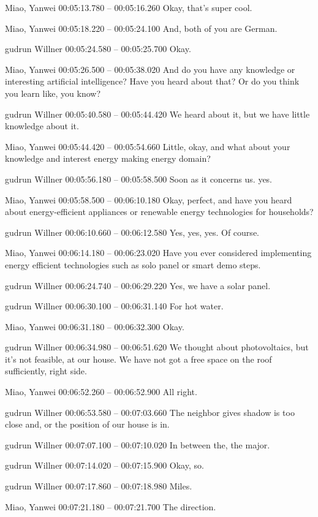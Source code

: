 {Miao, Yanwei 00:05:13.780 -- 00:05:16.260
Okay, that's super cool.

Miao, Yanwei 00:05:18.220 -- 00:05:24.100
And, both of you are German.

gudrun Willner 00:05:24.580 -- 00:05:25.700
Okay.

Miao, Yanwei 00:05:26.500 -- 00:05:38.020
And do you have any knowledge or interesting artificial intelligence? Have you heard about that? Or do you think you learn like, you know?

gudrun Willner 00:05:40.580 -- 00:05:44.420
We heard about it, but we have little knowledge about it.

Miao, Yanwei 00:05:44.420 -- 00:05:54.660
Little, okay, and what about your knowledge and interest energy making energy domain?

gudrun Willner 00:05:56.180 -- 00:05:58.500
Soon as it concerns us. yes.

Miao, Yanwei 00:05:58.500 -- 00:06:10.180
Okay, perfect, and have you heard about energy-efficient appliances or renewable energy technologies for households?

gudrun Willner 00:06:10.660 -- 00:06:12.580
Yes, yes, yes. Of course.

Miao, Yanwei 00:06:14.180 -- 00:06:23.020
Have you ever considered implementing energy efficient technologies such as solo panel or smart demo steps.

gudrun Willner 00:06:24.740 -- 00:06:29.220
Yes, we have a solar panel.

gudrun Willner 00:06:30.100 -- 00:06:31.140
For hot water.

Miao, Yanwei 00:06:31.180 -- 00:06:32.300
Okay.

gudrun Willner 00:06:34.980 -- 00:06:51.620
We thought about photovoltaics, but it's not feasible, at our house. We have not got a free space on the roof sufficiently, right side.

Miao, Yanwei 00:06:52.260 -- 00:06:52.900
All right.

gudrun Willner 00:06:53.580 -- 00:07:03.660
The neighbor gives shadow is too close and, or the position of our house is in.

gudrun Willner 00:07:07.100 -- 00:07:10.020
In between the, the major.

gudrun Willner 00:07:14.020 -- 00:07:15.900
Okay, so.

gudrun Willner 00:07:17.860 -- 00:07:18.980
Miles.

Miao, Yanwei 00:07:21.180 -- 00:07:21.700
The direction.

}
